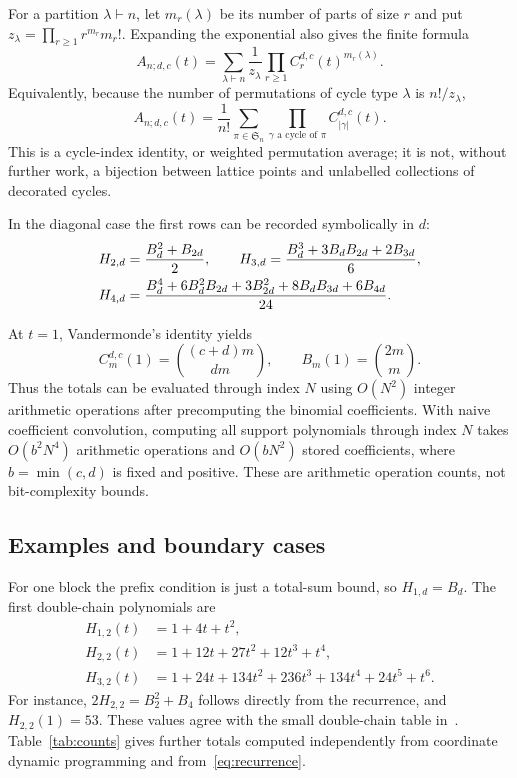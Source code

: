 \documentclass[11pt]{article}
\numberwithin{equation}{section}
\theoremstyle{definition}
\newcommand{\Adc}[1]{A_{#1;d,c}}
\begin{document}
For a partition $\lambda\vdash n$, let $m_r(\lambda)$ be its number of parts
of size $r$ and put $z_\lambda=\prod_{r\geq1}r^{m_r}m_r!$. Expanding the
exponential also gives the finite formula
\begin{equation}
 \Adc n(t)=\sum_{\lambda\vdash n}\frac{1}{z_\lambda}
                  \prod_{r\geq1}C_r^{d,c}(t)^{m_r(\lambda)}.
 \label{eq:partition}
\end{equation}
Equivalently, because the number of permutations of cycle type $\lambda$ is
$n!/z_\lambda$,
\begin{equation}
 \Adc n(t)=\frac1{n!}\sum_{\pi\in\mathfrak S_n}
   \prod_{\gamma\text{ a cycle of }\pi}C_{|\gamma|}^{d,c}(t).
 \label{eq:permutation}
\end{equation}
This is a cycle-index identity, or weighted permutation average; it is not,
without further work, a bijection between lattice points and unlabelled
collections of decorated cycles.

In the diagonal case the first rows can be recorded symbolically in $d$:
\begin{align}
 H_{2,d}&=\frac{B_d^2+B_{2d}}{2},\qquad
 H_{3,d}=\frac{B_d^3+3B_dB_{2d}+2B_{3d}}{6},\notag\\
 H_{4,d}&=\frac{B_d^4+6B_d^2B_{2d}+3B_{2d}^2+8B_dB_{3d}+6B_{4d}}{24}.
 \label{eq:symbolicrows}
\end{align}

At $t=1$, Vandermonde's identity yields
\begin{equation}
 C_m^{d,c}(1)=\binom{(c+d)m}{dm},\qquad B_m(1)=\binom{2m}{m}.
 \label{eq:unweightedbridge}
\end{equation}
Thus the totals can be evaluated through index $N$ using $O(N^2)$ integer
arithmetic operations after precomputing the binomial coefficients. With
naive coefficient convolution, computing all support polynomials through
index $N$ takes $O(b^2N^4)$ arithmetic operations and $O(bN^2)$ stored
coefficients, where $b=\min(c,d)$ is fixed and positive. These are arithmetic
operation counts, not bit-complexity bounds.

\subsection{Examples and boundary cases}
For one block the prefix condition is just a total-sum bound, so
$H_{1,d}=B_d$. The first double-chain polynomials are
\begin{align*}
 H_{1,2}(t)&=1+4t+t^2,\\
 H_{2,2}(t)&=1+12t+27t^2+12t^3+t^4,\\
 H_{3,2}(t)&=1+24t+134t^2+236t^3+134t^4+24t^5+t^6.
\end{align*}
For instance, $2H_{2,2}=B_2^2+B_4$ follows directly from the recurrence, and
$H_{2,2}(1)=53$. These values agree with the small double-chain table
in~\cite[Section~9.4]{AC}.
Table~\ref{tab:counts} gives further totals computed independently from
coordinate dynamic programming and from~\eqref{eq:recurrence}.
\end{document}
